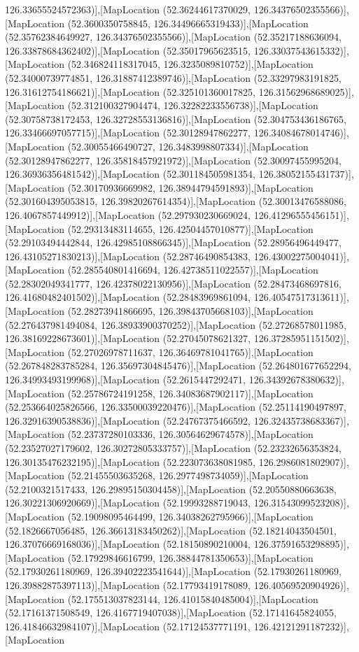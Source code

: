 126.33655524572363)],[MapLocation (52.36244617370029, 126.34376502355566)],[MapLocation (52.3600350758845, 126.34496665319433)],[MapLocation (52.35762384649927, 126.34376502355566)],[MapLocation (52.35217188636094, 126.33878684362402)],[MapLocation (52.35017965623515, 126.33037543615332)],[MapLocation (52.346824118317045, 126.3235089810752)],[MapLocation (52.34000739774851, 126.31887412389746)],[MapLocation (52.33297983191825, 126.31612754186621)],[MapLocation (52.325101360017825, 126.31562968689025)],[MapLocation (52.312100327904474, 126.32282233556738)],[MapLocation (52.30758738172453, 126.32728553136816)],[MapLocation (52.304753436186765, 126.33466697057715)],[MapLocation (52.30128947862277, 126.34084678014746)],[MapLocation (52.30055466490727, 126.3483998807334)],[MapLocation (52.30128947862277, 126.35818457921972)],[MapLocation (52.30097455995204, 126.36936356481542)],[MapLocation (52.301184505981354, 126.38052155431737)],[MapLocation (52.30170936669982, 126.38944794591893)],[MapLocation (52.301604395053815, 126.39820267614354)],[MapLocation (52.30013476588086, 126.4067857449912)],[MapLocation (52.297930230669024, 126.41296555456151)],[MapLocation (52.29313483114655, 126.42504457010877)],[MapLocation (52.29103494442844, 126.42985108866345)],[MapLocation (52.28956496449477, 126.43105271830213)],[MapLocation (52.28746490854383, 126.43002275004041)],[MapLocation (52.285540801416694, 126.42738511022557)],[MapLocation (52.28302049341777, 126.42378022130956)],[MapLocation (52.28473468697816, 126.41680482401502)],[MapLocation (52.28483969861094, 126.40547517313611)],[MapLocation (52.28273941866695, 126.39843705668103)],[MapLocation (52.276437981494084, 126.38933900370252)],[MapLocation (52.27268578011985, 126.38169228673601)],[MapLocation (52.27045078621327, 126.37285951151502)],[MapLocation (52.27026978711637, 126.36469781041765)],[MapLocation (52.267848283785284, 126.35697304845476)],[MapLocation (52.264801677652294, 126.34993493199968)],[MapLocation (52.2615447292471, 126.34392678380632)],[MapLocation (52.25786724191258, 126.34083687902117)],[MapLocation (52.253664025826566, 126.33500039220476)],[MapLocation (52.25114190497897, 126.32916390538836)],[MapLocation (52.24767375466592, 126.32435738683367)],[MapLocation (52.23737280103336, 126.30564629674578)],[MapLocation (52.23527027179602, 126.30272805333757)],[MapLocation (52.23232656353824, 126.30135476232195)],[MapLocation (52.223073638081985, 126.2986081802907)],[MapLocation (52.21455503635268, 126.2977498734059)],[MapLocation (52.2100321517433, 126.29895150304458)],[MapLocation (52.20550880663638, 126.30221306920669)],[MapLocation (52.19993288719043, 126.31543099523208)],[MapLocation (52.19098095464499, 126.34038262795966)],[MapLocation (52.1826667056485, 126.36613183450262)],[MapLocation (52.18214043504501, 126.37076669168036)],[MapLocation (52.18150890210004, 126.37591653298895)],[MapLocation (52.17929846616799, 126.38844781350653)],[MapLocation (52.17930261180969, 126.39402223541644)],[MapLocation (52.17930261180969, 126.39882875397113)],[MapLocation (52.17793419178089, 126.40569520904926)],[MapLocation (52.175513037823144, 126.41015840485004)],[MapLocation (52.17161371508549, 126.4167719407038)],[MapLocation (52.17141645824055, 126.41846632984107)],[MapLocation (52.17124537771191, 126.42121291187232)],[MapLocation 